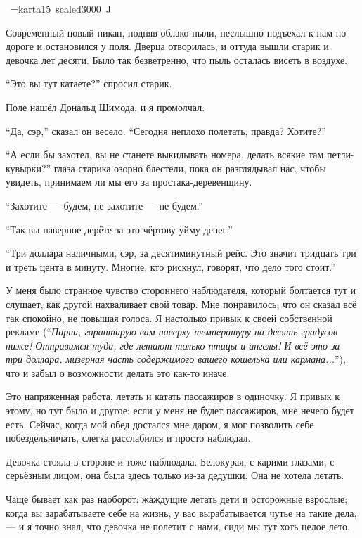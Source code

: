 \vskip28pt
\hbox{\kern7cm \font\karta=karta15 scaled3000 \karta ^^4a}
\vskip15pt

Современный новый пикап, подняв облако пыли, неслышно подъехал к нам по дороге и остановился у поля. Дверца отворилась, и оттуда вышли старик и девочка лет десяти. Было так безветренно, что пыль осталась висеть в воздухе.

``Это вы тут катаете?'' спросил старик.

Поле нашёл Дональд Шимода, и я промолчал.

``Да, сэр,'' сказал он весело. ``Сегодня неплохо полетать, правда? Хотите?''

``А если бы захотел, вы не станете выкидывать номера, делать всякие там петли-кувырки?'' глаза
 старика озорно блестели, пока он разглядывал нас, чтобы увидеть, принимаем ли мы его за
 прос\-та\-ка-де\-ре\-вен\-щи\-ну.

``Захотите --- будем, не захотите --- не будем.''

``Так вы наверное дерёте за это чёртову уйму денег.''

``Три доллара наличными, сэр, за десятиминутный рейс. Это значит тридцать три и треть цента в
 минуту. Многие, кто рискнул, говорят, что дело того стоит.''

У меня было странное чувство стороннего наблюдателя, который болтается тут и слушает, как другой
нахваливает свой товар. Мне понравилось, что он сказал всё так спокойно, не повышая голоса. Я
настолько привык к своей собственной рекламе (``{\sl Парни, гарантирую вам наверху температуру на десять
градусов ниже! Отправимся туда, где летают только птицы и ангелы! И всё это за три доллара,
 мизерная часть содержимого вашего кошелька или кармана...}''), что и забыл о возможности делать это как-то иначе.

Это напряженная работа, летать и катать пассажиров в одиночку. Я привык к этому, но тут было и
 другое: если у меня не будет пассажиров, мне нечего будет есть. Сейчас, когда мой обед достался мне даром, я мог позволить себе побездельничать, слегка расслабился и просто наблюдал.

Девочка стояла в стороне и тоже наблюдала. Белокурая, с карими глазами, с серьёзным лицом, она была здесь только из-за дедушки. Она не хотела летать.

Чаще бывает как раз наоборот: жаждущие летать дети и осторожные взрослые; когда вы зарабатываете себе на жизнь, у вас вырабатывается чутье на такие дела, --- и я точно знал, что девочка не полетит с нами, сиди мы тут хоть целое лето.


